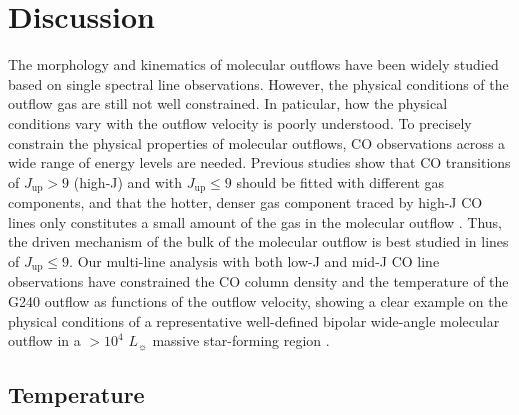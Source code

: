 \section{Discussion}\label{discussion}
The morphology and kinematics of molecular outflows have been widely studied based on single spectral line observations. However, the physical conditions of the outflow gas are still not well constrained. In paticular, how the physical conditions vary with the outflow velocity is poorly understood. To precisely constrain the physical properties of molecular outflows, CO observations across a wide range of energy levels are needed. Previous studies show that CO transitions of $J_{\mathrm{up}} > 9$ (high-J) and with $J_{\mathrm{up}} \le 9$ should be fitted with different gas components, and that the hotter, denser gas component traced by high-J CO lines only constitutes a small amount of the gas in the molecular outflow \citep{2013A&A...555A...8G, 2015A&A...581A...4L}. Thus, the driven mechanism of the bulk of the molecular outflow is best studied in lines of $J_{\mathrm{up}} \le 9$. Our multi-line analysis with both low-J and mid-J CO line observations have constrained the CO column density and the temperature of the G240 outflow as functions of the outflow velocity, showing a clear example on the physical conditions of a representative well-defined bipolar wide-angle molecular outflow in a $> 10^4$ $L_\sun$ massive star-forming region \citep{2009ApJ...696...66Q}.

\subsection{Temperature}

